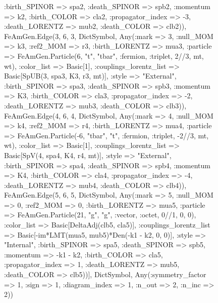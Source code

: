 \documentclass{revtex4}
\begin{document}
\begin{figure}[!htb]
\begin{center}
{:birth_SPINOR => spa2, :death_SPINOR => spb2, :momentum => k2, :birth_COLOR => cla2, :propagator_index => -3, :death_LORENTZ => mub2, :death_COLOR => clb2)), FeAmGen.Edge(3, 6, 3, Dict{Symbol, Any}(:mark => 3, :null_MOM => k3, :ref2_MOM => r3, :birth_LORENTZ => mua3, :particle => FeAmGen.Particle(6, "t", "tbar", :fermion, :triplet, 2//3, mt, wt), :color_list => Basic[1], :couplings_lorentz_list => Basic[SpUB(3, spa3, K3, r3, mt)], :style => "External", :birth_SPINOR => spa3, :death_SPINOR => spb3, :momentum => K3, :birth_COLOR => cla3, :propagator_index => -2, :death_LORENTZ => mub3, :death_COLOR => clb3)), FeAmGen.Edge(4, 6, 4, Dict{Symbol, Any}(:mark => 4, :null_MOM => k4, :ref2_MOM => r4, :birth_LORENTZ => mua4, :particle => FeAmGen.Particle(-6, "tbar", "t", :fermion, :triplet, -2//3, mt, wt), :color_list => Basic[1], :couplings_lorentz_list => Basic[SpV(4, spa4, K4, r4, mt)], :style => "External", :birth_SPINOR => spa4, :death_SPINOR => spb4, :momentum => K4, :birth_COLOR => cla4, :propagator_index => -4, :death_LORENTZ => mub4, :death_COLOR => clb4)), FeAmGen.Edge(5, 6, 5, Dict{Symbol, Any}(:mark => 5, :null_MOM => 0, :ref2_MOM => 0, :birth_LORENTZ => mua5, :particle => FeAmGen.Particle(21, "g", "g", :vector, :octet, 0//1, 0, 0), :color_list => Basic[DeltaAdj(clb5, cla5)], :couplings_lorentz_list => Basic[-im*LMT(mua5, mub5)*Den(-k1 - k2, 0, 0)], :style => "Internal", :birth_SPINOR => spa5, :death_SPINOR => spb5, :momentum => -k1 - k2, :birth_COLOR => cla5, :propagator_index => 1, :death_LORENTZ => mub5, :death_COLOR => clb5))], Dict{Symbol, Any}(:symmetry_factor => 1, :sign => 1, :diagram_index => 1, :n_out => 2, :n_inc => 2)) 
}
\end{center}
\end{figure}
\end{document}
